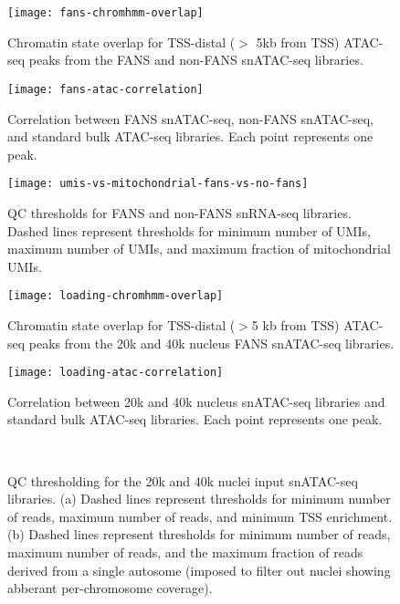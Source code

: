 \documentclass{article}
\begin{document}
\renewcommand{\thefigure}{\textbf{S\arabic{figure}. }}
\setcounter{figure}{0}

\begin{figure}
\texttt{[image: fans-chromhmm-overlap]}
	\caption{Chromatin state overlap for TSS-distal ($>$ 5kb from TSS) ATAC-seq peaks from the FANS and non-FANS snATAC-seq libraries.}
\end{figure}

\begin{figure}
\texttt{[image: fans-atac-correlation]}
\caption{Correlation between FANS snATAC-seq, non-FANS snATAC-seq, and standard bulk ATAC-seq libraries. Each point represents one peak.}
\end{figure}

\begin{figure}
\texttt{[image: umis-vs-mitochondrial-fans-vs-no-fans]}
\caption{QC thresholds for FANS and non-FANS snRNA-seq libraries. Dashed lines represent thresholds for minimum number of UMIs, maximum number of UMIs, and maximum fraction of mitochondrial UMIs.}
\end{figure}

\begin{figure}
\texttt{[image: loading-chromhmm-overlap]}
	\caption{Chromatin state overlap for TSS-distal ($>$5 kb from TSS) ATAC-seq peaks from the 20k and 40k nucleus FANS snATAC-seq libraries.}
\end{figure}

\begin{figure}
\texttt{[image: loading-atac-correlation]}
\caption{Correlation between 20k and 40k nucleus snATAC-seq libraries and standard bulk ATAC-seq libraries. Each point represents one peak.}
\end{figure}

\begin{figure}
	\\
	\caption{QC thresholding for the 20k and 40k nuclei input snATAC-seq libraries. (a) Dashed lines represent thresholds for minimum number of reads, maximum number of reads, and minimum TSS enrichment. (b) Dashed lines represent thresholds for minimum number of reads, maximum number of reads, and the maximum fraction of reads derived from a single autosome (imposed to filter out nuclei showing abberant per-chromosome coverage).}
\end{figure} 
\end{document}
